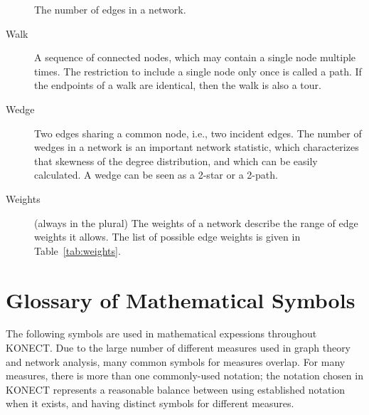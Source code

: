 \documentclass{article}
\begin{document}
\begin{description}
    The number of edges in a network.  
  \item[Walk]
    A sequence of connected nodes, which may contain a single node
    multiple times.  The restriction to include a single node only once
    is called a path.  If the endpoints of a walk are identical, then
    the walk is also a tour.  
  \item[Wedge] 
    Two edges sharing a common node, i.e., two incident edges.  The
    number of wedges in a network is an important network statistic,
    which characterizes that skewness of the degree distribution, and
    which can be easily calculated.  A wedge can be seen as a 2-star or
    a 2-path.  
  \item[Weights] (always in the plural)
    The weights of a network describe the range of edge weights it
    allows.  The list of possible edge weights is given in
    Table~\ref{tab:weights}.  
\end{description}

\section{Glossary of Mathematical Symbols}

The following symbols are used in mathematical expessions throughout
KONECT.  Due to the large number of different measures used in graph
theory and network analysis, many common symbols for measures overlap.
For many measures, there is more than one commonly-used notation; the
notation chosen in KONECT represents a reasonable balance between using established
notation when it exists, and having distinct symbols for different
measures. \\
\end{document}
